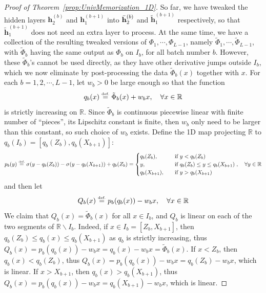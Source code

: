 \documentclass{article}
\numberwithin{equation}{section}
\theoremstyle{definition}
\newcommand{\eqdef}{\ensuremath{\stackrel{\mbox{\upshape\tiny def.}}{=}}}
\begin{document}
\begin{proof}[{Proof of Theorem~\ref{prop:UnivMemorization_1D}}]
So far, we have tweaked the hidden layers $\mathbf{h}_2^{(b)}$ and $\mathbf{h}_1^{(b+1)}$ into $\Bar{\mathbf{h}}_2^{(b)}$ and $\tilde{\mathbf{h}}_1^{(b+1)}$ respectively, so that $\tilde{\mathbf{h}}_1^{(b+1)}$ does not need an extra layer to process. At the same time, we have a collection of the resulting tweaked versions of $\Phi_1,\cdots,\Phi_{L-1}$, namely $\tilde{\Phi}_1,\cdots,\tilde{\Phi}_{L-1}$, with $\tilde{\Phi}_b$ having the same output as $\Phi_b$ on $I_b$, for all batch number $b$. However, these $\tilde{\Phi}_b$'s cannot be used directly, as they have other derivative jumps outside $I_b$, which we now eliminate by post-processing the data $\tilde{\Phi}_b (x)$ together with $x$. For each $b=1,2,\cdots,L-1$, let $w_b>0$ be large enough so that the function 
\[
    q_b(x) \eqdef \tilde{\Phi}_b (x) + w_b x,
    \quad \forall x\in\mathbb{R}
\]
is strictly increasing on $\mathbb{R}$. Since $\tilde{\Phi}_b$ is continuous piecewise linear with finite number of ``pieces'', its Lipschitz constant is finite, then $w_b$ only need to be larger than this constant, so such choice of $w_b$ exists. Define the 1D map projecting $\mathbb{R}$ to $q_b(I_b) = [q_b(Z_b), q_b(X_{b+1})]$: 
\[
    p_b(y)
    \eqdef 
    \sigma(y - q_b(Z_b)) 
    - 
    \sigma(y - q_b(X_{b+1}))
    +
    q_b(Z_b)
    =
    \begin{cases}
        q_b(Z_b),     \quad &\text{if } y < q_b(Z_b)  \\
        y,            \quad &\text{if } q_b(Z_b) \le y \le q_b(X_{b+1})  \\
        q_b(X_{b+1}), \quad &\text{if } y > q_b(X_{b+1})  \\
    \end{cases},
    \quad \forall y \in \mathbb{R}
\]
and then let 
\[
    Q_b(x)
    \eqdef
    p_b ( q_b(x) ) - w_b x,
    \quad \forall x \in \mathbb{R}
\]
We claim that $Q_b(x) = \tilde{\Phi}_b (x)$ for all $x\in I_b$, and $Q_b$ is linear on each of the two segments of $\mathbb{R}\backslash I_b$. Indeed, if $x\in I_b = [Z_b, X_{b+1}]$, then $q_b(Z_b) \le q_b(x) \le q_b(X_{b+1})$ as $q_b$ is strictly increasing, thus $Q_b(x) = p_b (q_b(x)) - w_b x = q_b(x) - w_b x = \tilde{\Phi}_b (x)$. If $x < Z_b$, then $q_b(x) < q_b(Z_b)$, thus $Q_b(x) = p_b (q_b(x)) - w_b x = q_b(Z_b) - w_b x$, which is linear. If $x > X_{b+1}$, then $q_b(x) > q_b(X_{b+1})$, thus $Q_b(x) = p_b (q_b(x)) - w_b x = q_b(X_{b+1}) - w_b x$, which is linear.


\end{proof}
\end{document}
